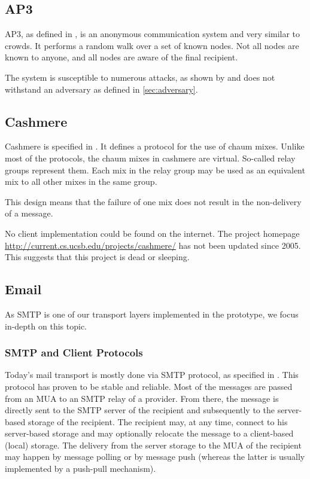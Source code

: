 \subsection{AP3}
AP3, as defined in \cite{mislove2004ap3}, is an anonymous communication system and very similar to crowds. It performs a random walk over a set of known nodes. Not all nodes are known to anyone, and all nodes are aware of the final recipient. 

The system is susceptible to numerous attacks, as shown by \cite{ccs2008:mittal} and does not withstand an adversary as defined in \ref{sec:adversary}.

\subsection{Cashmere}
Cashmere is specified in \cite{zhuang2005cashmere}. It defines a protocol for the use of chaum mixes. Unlike most of the protocols, the chaum mixes in cashmere are virtual. So-called relay groups represent them. Each mix in the relay group may be used as an equivalent mix to all other mixes in the same group. 

This design means that the failure of one mix does not result in the non-delivery of a message.

No client implementation could be found on the internet. The project homepage \href{http://current.cs.ucsb.edu/projects/cashmere/}{http://current.cs.ucsb.edu/projects/cashmere/} has not been updated since 2005. This suggests that this project is dead or sleeping.

\subsection{Email\label{sec:mailTransport}}
As SMTP is one of our transport layers implemented in the prototype, we focus in-depth on this topic.

\subsubsection{SMTP and Client Protocols}
Today's mail transport is mostly done via SMTP protocol, as specified in \cite{RFC5321}. This protocol has proven to be stable and reliable. Most of the messages are passed from an MUA to an SMTP relay of a provider. From there, the message is directly sent to the SMTP server of the recipient and subsequently to the server-based storage of the recipient. The recipient may, at any time, connect to his server-based storage and may optionally relocate the message to a client-based (local) storage. The delivery from the server storage to the MUA of the recipient may happen by message polling or by message push (whereas the latter is usually implemented by a push-pull mechanism).

